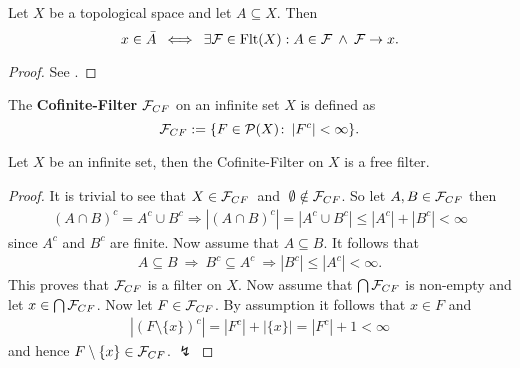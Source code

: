 \begin{thm}\label{thm:fcl}
  Let $X$ be a topological space and let $A \subseteq X$. Then
  \begin{equation*}
    x \in \bar{A} \: \iff \: \exists \mathcal{F} \in {\rm Flt}(X): A \in \mathcal{F} \: \land \: \mathcal{F} \to x.
  \end{equation*}
\end{thm}

\begin{proof}
  See \cite[5.17 Satz]{BvQMT}.
\end{proof}

\begin{defin}
  The \textbf{Cofinite-Filter} $\mathcal{F}_{CF}$ on an infinite set $X$ is defined as 
  \begin{equation*}
    \mathcal{F}_{CF} := \{ F \in \mathcal{P}(X)\colon \left| F^c \right| < \infty\}.\qedhere
  \end{equation*}
\end{defin}

\begin{lemma}\label{lem:coffil}
  Let $X$ be an infinite set, then the Cofinite-Filter on $X$ is a free filter.
\end{lemma}

\begin{proof}
  It is trivial to see that $X \in \mathcal{F}_{CF}\:$ and $\:\emptyset \notin \mathcal{F}_{CF}$. So let $A, B \in \mathcal{F}_{CF}$ then
  \begin{align*}
    (A \cap B)^c = A^c \cup B^c \Rightarrow \left| (A \cap B)^c \right| = \left | A^c \cup B^c \right| \leq \left| A^c \right| + \left| B^c \right| < \infty
  \end{align*}
  since $A^c$ and $B^c$ are finite.
  Now assume that $A \subseteq B$. It follows that
  \begin{align*}
    A \subseteq B \: \Rightarrow \: B^c \subseteq A^c \: \Rightarrow \left|B^c\right| \leq \left|A^c\right| < \infty.
  \end{align*}
  This proves that $\mathcal{F}_{CF}$ is a filter on $X$.
  Now assume that $\bigcap \mathcal{F}_{CF}$ is non-empty and let $x \in \bigcap \mathcal{F}_{CF}$. Now let $F \in \mathcal{F}_{CF}$. By assumption it follows that $x \in F$ and
  \begin{align*}
    \left|(F\setminus \{x\})^c\right| = \left| F^c \right| + \left| \{x \} \right| = \left| F^c \right| + 1 < \infty
  \end{align*}
  and hence $F\setminus \{x\} \in \mathcal{F}_{CF}$. $\lightning$
\end{proof}


